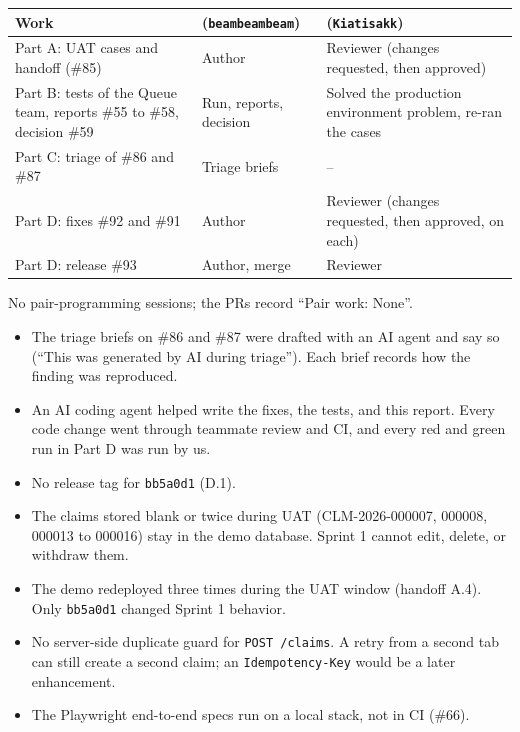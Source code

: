 
\begin{longtable}{@{}R{5.4cm}R{5cm}R{5.6cm}@{}}
\toprule \textbf{Work} & \textbf{\studentTwoName{} (\texttt{beambeambeam})} & \textbf{\studentOneName{} (\texttt{Kiatisakk})} \\ \midrule \endhead
Part A: UAT cases and handoff (\#85) & Author & Reviewer (changes requested, then approved) \\
Part B: tests of the Queue team, reports \#55 to \#58, decision \#59 & Run, reports, decision & Solved the production environment problem, re-ran the cases \\
Part C: triage of \#86 and \#87 & Triage briefs & – \\
Part D: fixes \#92 and \#91 & Author & Reviewer (changes requested, then approved, on each) \\
Part D: release \#93 & Author, merge & Reviewer \\
\bottomrule
\end{longtable}

No pair-programming sessions; the PRs record ``Pair work: None''.


\begin{itemize}
\item The triage briefs on \#86 and \#87 were drafted with an AI agent and say so (``This was generated by AI during triage''). Each brief records how the finding was reproduced.
\item An AI coding agent helped write the fixes, the tests, and this report. Every code change went through teammate review and CI, and every red and green run in Part D was run by us.
\end{itemize}


\begin{itemize}
\item No release tag for \texttt{bb5a0d1} (D.1).
\item The claims stored blank or twice during UAT (CLM-2026-000007, 000008, 000013 to 000016) stay in the demo database. Sprint 1 cannot edit, delete, or withdraw them.
\item The demo redeployed three times during the UAT window (handoff A.4). Only \texttt{bb5a0d1} changed Sprint 1 behavior.
\item No server-side duplicate guard for \texttt{POST /claims}. A retry from a second tab can still create a second claim; an \texttt{Idempotency-Key} would be a later enhancement.
\item The Playwright end-to-end specs run on a local stack, not in CI (\#66).
\end{itemize}
